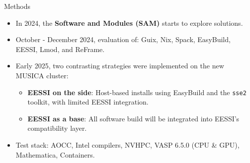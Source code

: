 \documentclass[final]{beamer}
\begin{document}
\begin{frame}[t]
\begin{columns}[t]
\begin{column}{0.33\textwidth}
    \begin{block}{Methods}
        \begin{itemize}
          \item In 2024, the \textbf{Software and Modules (SAM)} starts to explore solutions.
          \item October - December 2024, evaluation of: Guix, Nix, Spack, EasyBuild, EESSI, Lmod, and ReFrame.
          \item Early 2025, two contrasting strategies were implemented on the new MUSICA cluster:
          \begin{itemize}
            \item \textbf{EESSI on the side}: Host-based installs using EasyBuild and the \texttt{sse2} toolkit, with limited EESSI integration.
            \item \textbf{EESSI as a base}: All software build will be integrated into EESSI's compatibility layer.
          \end{itemize}
          \item Test stack: AOCC, Intel compilers, NVHPC, VASP 6.5.0 (CPU \& GPU), Mathematica, Containers.

        \end{itemize}
    \end{block}


\end{column}
\end{columns}
\end{frame}
\end{document}
